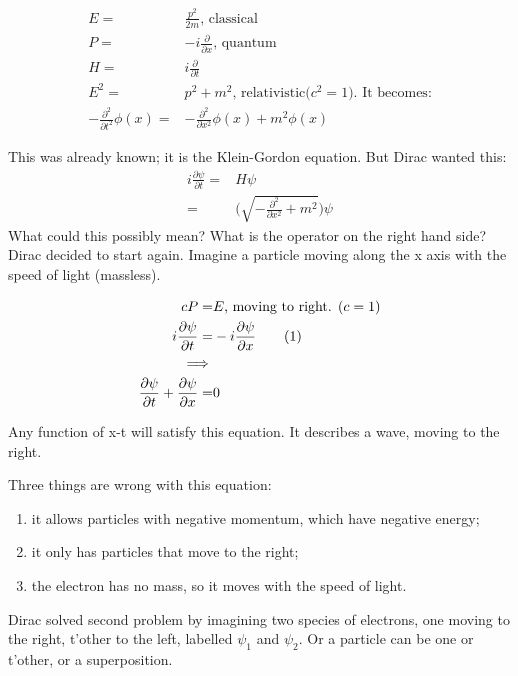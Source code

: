 \documentclass[]{article}
\newcommand\numberthis{\addtocounter{equation}{1}\tag{\theequation}}
\begin{document}
\begin{align*}
	E =& \frac{p^2}{2m} \text {, classical}\\
	P =& -i \frac{\partial}{\partial x} \text{, quantum}\\
	H = & i \frac{\partial}{\partial t}\\
	E^2 =& p^2 + m^2 \text{, relativistic($c^2=1$). It becomes:}\\
	-\frac{\partial^2}{\partial t^2} \phi(x) =& -\frac{\partial^2}{\partial x^2}\phi(x) + m^2 \phi(x) 
\end{align*}

This was already known; it is the Klein-Gordon equation. But Dirac wanted this:
\begin{align*}
	i \frac{\partial \psi}{\partial t} =& H\psi\\
	=& \big(\sqrt{- \frac{\partial^2}{\partial x^2} + m^2}\big) \psi  
\end{align*}
What could this possibly mean? What is the operator on the right hand side? Dirac decided to start again. Imagine a particle moving along the x axis with the speed of light (massless).

\begin{align*}
	c P =& E \text{, moving to right. ($c=1$)}\\
	i \frac{\partial \psi}{\partial t} =& -i \frac{\partial \psi}{\partial x} \numberthis\label{eq:dirac1:R}\\
	\implies&\\
	\frac{\partial \psi}{\partial t} + \frac{\partial \psi}{\partial x}=&0
\end{align*}

Any function of x-t will satisfy this  equation. It describes a wave, moving to the right.

Three things are wrong with this equation:
\begin{enumerate}
	\item it allows particles with negative momentum, which have negative energy;\label{item:negative:energy}
	\item it only has particles that move to the right;\label{item:right:only}
	\item the electron has no mass, so it moves with the speed of light.\label{item:speed:light}
\end{enumerate}

Dirac solved second problem by imagining two species of electrons, one moving to the right, t'other to the left, labelled $\psi_1$ and $\psi_2$. Or a particle can be one or t'other, or a superposition.
\end{document}
